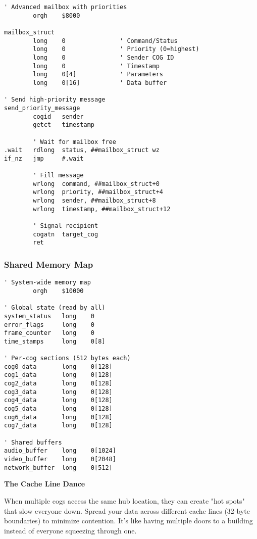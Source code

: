 \documentclass[11pt]{book}
\begin{document}
\begin{lstlisting}
' Advanced mailbox with priorities
        orgh    $8000
        
mailbox_struct
        long    0               ' Command/Status
        long    0               ' Priority (0=highest)
        long    0               ' Sender COG ID
        long    0               ' Timestamp
        long    0[4]            ' Parameters
        long    0[16]           ' Data buffer

' Send high-priority message
send_priority_message
        cogid   sender
        getct   timestamp
        
        ' Wait for mailbox free
.wait   rdlong  status, ##mailbox_struct wz
if_nz   jmp     #.wait
        
        ' Fill message
        wrlong  command, ##mailbox_struct+0
        wrlong  priority, ##mailbox_struct+4
        wrlong  sender, ##mailbox_struct+8
        wrlong  timestamp, ##mailbox_struct+12
        
        ' Signal recipient
        cogatn  target_cog
        ret
\end{lstlisting}

\hypertarget{shared-memory-map}{%
\subsubsection{Shared Memory Map}\label{shared-memory-map}}

\begin{lstlisting}
' System-wide memory map
        orgh    $10000
        
' Global state (read by all)
system_status   long    0
error_flags     long    0
frame_counter   long    0
time_stamps     long    0[8]

' Per-cog sections (512 bytes each)
cog0_data       long    0[128]
cog1_data       long    0[128]
cog2_data       long    0[128]
cog3_data       long    0[128]
cog4_data       long    0[128]
cog5_data       long    0[128]
cog6_data       long    0[128]
cog7_data       long    0[128]

' Shared buffers
audio_buffer    long    0[1024]
video_buffer    long    0[2048]
network_buffer  long    0[512]
\end{lstlisting}

\begin{interlude}
\textbf{The Cache Line Dance}

When multiple cogs access the same hub location, they can create "hot spots" that slow everyone down. Spread your data across different cache lines (32-byte boundaries) to minimize contention. It's like having multiple doors to a building instead of everyone squeezing through one.
\end{interlude}
\end{document}
